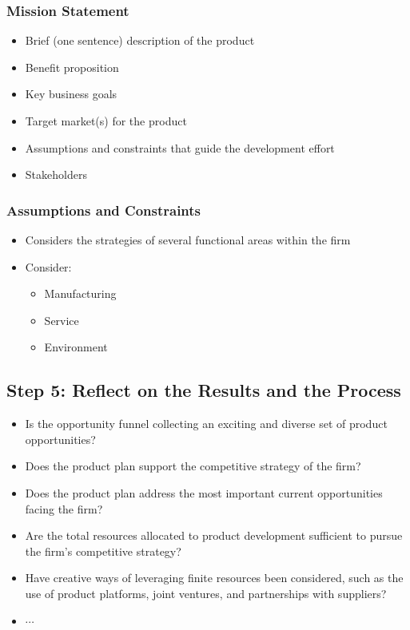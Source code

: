 \documentclass[openany,12pt,a4paper]{book}
\begin{document}
\subsubsection{Mission Statement}
\begin{itemize}
    \item Brief (one sentence) description of the product
    \item Benefit proposition
    \item Key business goals
    \item Target market(s) for the product
    \item Assumptions and constraints that guide the development effort
    \item Stakeholders
\end{itemize}
\subsubsection{Assumptions and Constraints}
\begin{itemize}
    \item Considers the strategies of several functional areas within the firm
    \item Consider:
    \begin{itemize}
        \item Manufacturing
        \item Service
        \item Environment
    \end{itemize}
\end{itemize}

\subsection{Step 5: Reflect on the Results and the Process}
\begin{itemize}
    \item Is the opportunity funnel collecting an exciting and diverse set of product opportunities?
    \item Does the product plan support the competitive strategy of the firm?
    \item Does the product plan address the most important current opportunities facing the firm?
    \item Are the total resources allocated to product development sufficient to pursue the firm's competitive strategy?
    \item Have creative ways of leveraging finite resources been considered, such as the use of product platforms, joint ventures, and partnerships with suppliers?
    \item $\cdots$
\end{itemize}
\end{document}
